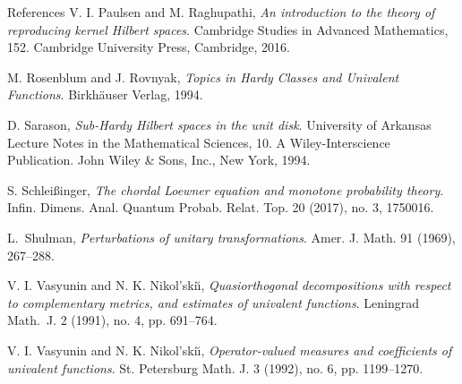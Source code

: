 \documentclass[12pt]{article}
\numberwithin{equation}{section}
\begin{document}
\begin{thebibliography}{References}
V. I. Paulsen and M. Raghupathi, 
\textit{An introduction to the theory of reproducing kernel Hilbert spaces}.
Cambridge Studies in Advanced Mathematics, 152. Cambridge University Press, Cambridge, 2016. 

M. Rosenblum and J. Rovnyak, 
\textit{Topics in Hardy Classes and Univalent Functions}. 
Birkh\"{a}user Verlag, 1994.

D. Sarason, 
\textit{Sub-Hardy Hilbert spaces in the unit disk}. 
University of Arkansas Lecture Notes in the Mathematical Sciences, 10. 
A Wiley-Interscience Publication. John Wiley \& Sons, Inc., New York, 1994. 

S. Schlei{\ss}inger, 
\textit{The chordal Loewner equation and monotone probability theory}. 
Infin. Dimens. Anal. Quantum Probab. Relat. Top. 20 (2017), no. 3, 1750016.  

L.\ Shulman, 
\textit{Perturbations of unitary transformations}.
Amer. J. Math.   91 (1969), 267--288.

V. I. Vasyunin and N. K. Nikol'ski\u{\i}, 
\textit{Quasiorthogonal decompositions with respect to complementary metrics, and estimates of univalent functions}. 
Leningrad Math.\ J. 2 (1991), no. 4, pp. 691--764. 

V. I. Vasyunin and N. K. Nikol'ski\u{\i}, 
\textit{Operator-valued measures and coefficients of univalent functions}.
St. Petersburg Math. J. 3 (1992), no. 6, pp. 1199--1270.


\end{thebibliography}
\end{document}

